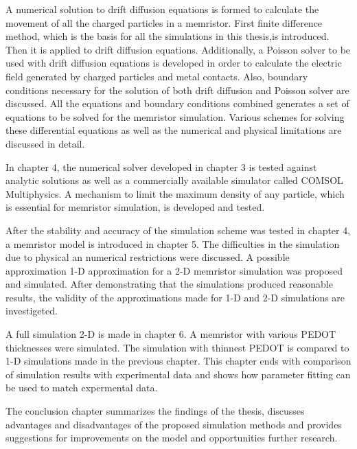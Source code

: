 \begin{doublespace}
A numerical solution to drift diffusion equations is formed to calculate the movement of all the charged particles in a memristor. First finite difference method, which is the basis for all the simulations in this thesis,is introduced. Then it is applied to drift diffusion equations. Additionally, a Poisson solver to be used with drift diffusion equations is developed in order to calculate the electric field generated by charged particles and metal contacts. Also, boundary conditions necessary for the solution of both drift diffusion and Poisson solver are discussed. All the equations and boundary conditions combined generates a set of equations to be solved for the memristor simulation. Various schemes for solving these differential equations as well as the numerical and physical limitations are discussed in detail.
 
In chapter 4, the numerical solver developed in chapter 3 is tested against analytic solutions as well as a commercially available simulator called COMSOL Multiphysics. A mechanism to limit the maximum density of any particle, which is essential for memristor simulation, is developed and tested. 

After the stability and accuracy of the simulation scheme was tested in chapter 4, a memristor model is introduced in chapter 5. The difficulties in the simulation due to physical an numerical restrictions were discussed. A possible approximation 1-D approximation for a 2-D memristor simulation was proposed and simulated. After demonstrating that the simulations produced reasonable results, the validity of the approximations made for 1-D and 2-D simulations are investigeted.  

A full simulation 2-D is made in chapter 6. A memristor with various PEDOT thicknesses were simulated. The simulation with thinnest PEDOT is compared to 1-D simulations made in the previous chapter. This chapter ends with comparison of simulation results with experimental data and shows how parameter fitting can be used to match expermental data.

The conclusion chapter summarizes the findings of the thesis, discusses advantages and disadvantages of the proposed simulation methods and provides suggestions for improvements on the model and opportunities further research.



\end{doublespace}
